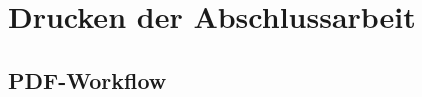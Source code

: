 \chapter{Drucken der Abschlussarbeit}
\label{cha:Drucken}




\section{PDF-Workflow}
\label{sec:pdf}




